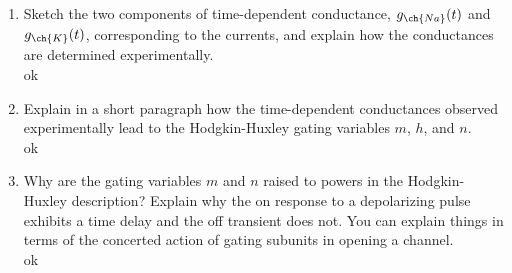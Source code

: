 \documentclass[11pt]{article}
\begin{document}
\begin{enumerate}[label=\arabic*.]
\begin{enumerate}[label=(\alph*)]
\vspace*{1\baselineskip}
\item
Sketch the two components of time-dependent conductance, $g_{\ch{Na}}(t)$ and $g_{\ch{K}}(t)$, corresponding to the currents, and explain how the conductances are determined experimentally.
\vspace*{1\baselineskip}
\\
ok









\vspace*{1\baselineskip}
\item
Explain in a short paragraph how the time-dependent conductances observed experimentally lead to the Hodgkin-Huxley gating variables $m$, $h$, and $n$. 
\vspace*{1\baselineskip}
\\
ok








\vspace*{1\baselineskip}
\item
Why are the gating variables $m$ and $n$ raised to powers in the Hodgkin-Huxley description? Explain why the on response to a depolarizing pulse exhibits a time delay and the off transient does not. You can explain things in terms of the concerted action of gating subunits in opening a channel.
\vspace*{1\baselineskip}
\\
ok









\end{enumerate}







































\end{enumerate}
\end{document}
